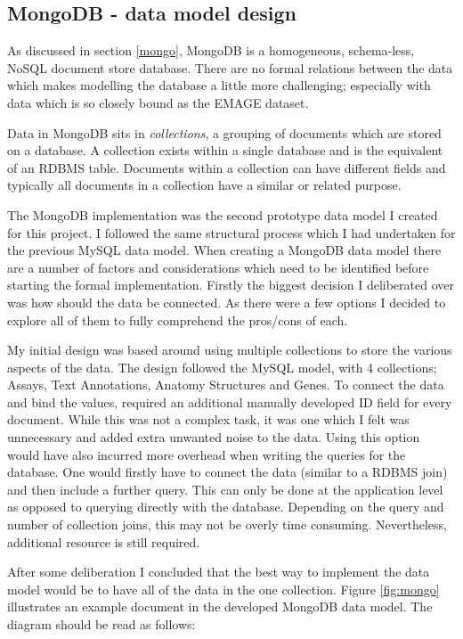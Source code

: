 \subsection{MongoDB  - data model design}\label{mongodesign}

As discussed in section \ref{mongo}, MongoDB is a homogeneous, schema-less, NoSQL document store database. There are no formal relations between the data which makes modelling the database a little more challenging; especially with data which is so closely bound as the EMAGE dataset.

Data in MongoDB sits in \textit{collections}, a grouping of documents which are stored on a database. A collection exists within a single database and is the equivalent of an RDBMS table. Documents within a collection can have different fields and typically all documents in a collection have a similar or related purpose. 

The MongoDB implementation was the second prototype data model I created for this project. I followed the same structural process which I had undertaken for the previous MySQL data model. When creating a MongoDB data model there are a number of factors and considerations which need to be identified before starting the formal implementation. Firstly the biggest decision I deliberated over was how should the data be connected. As there were a few options I decided to explore all of them to fully comprehend the pros/cons of each.

My initial design was based around using multiple collections to store the various aspects of the data. The design followed the MySQL model, with 4 collections; Assays, Text Annotations, Anatomy Structures and Genes. To connect the data and bind the values, required an additional manually developed ID field for every document. While this was not a complex task, it was one which I felt was unnecessary and added extra unwanted noise to the data. Using this option would have also incurred more overhead when writing the queries for the database. One would firstly have to connect the data (similar to a RDBMS join) and then include a further query. This can only be done at the application level as opposed to querying directly with the database. Depending on the query and number of collection joins, this may not be overly time consuming. Nevertheless, additional resource is still required. 

After some deliberation I concluded that the best way to implement the data model would be to have all of the data in the one collection. Figure \ref{fig:mongo} illustrates an example document in the developed MongoDB data model. The diagram should be read as follows:

